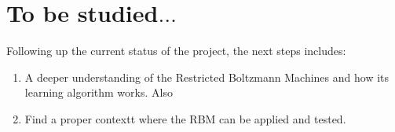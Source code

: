 \section*{To be studied$\ldots$}%
\label{ch:future:to-be-studied}%

Following up the current status of the project, the next steps includes:
\begin{enumerate}
  \item A deeper understanding of the Restricted Boltzmann Machines and how its learning algorithm works. 
    Also

  \item Find a proper contextt where the RBM can be applied and tested.
\end{enumerate}
